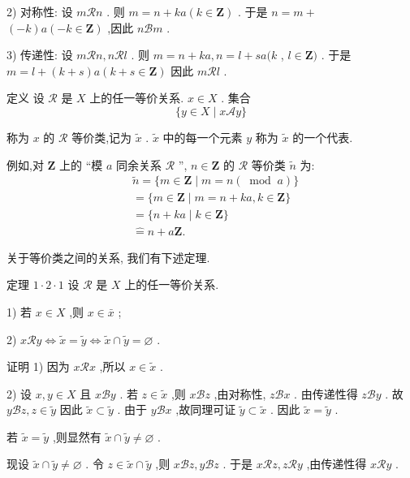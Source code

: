 2) 对称性: 设 $m\mathcal{R}n$ . 则 $m = n + {ka}\left( {k \in  \mathbf{Z}}\right)$ . 于是 $n = m +$  $\left( {-k}\right) a\left( {-k \in  \mathbf{Z}}\right)$ ,因此 $n\mathcal{B}m$ .

3) 传递性: 设 $m\mathcal{R}n,n\mathcal{R}l$ . 则 $m = n + {ka},n = l + {sa}(k$ , $l \in  \mathbf{Z})$ . 于是 $m = l + \left( {k + s}\right) a\left( {k + s \in  \mathbf{Z}}\right)$ 因此 $m\mathcal{R}l$ .

定义 设 $\mathcal{R}$ 是 $X$ 上的任一等价关系. $x \in  X$ . 集合
$$\{ y \in  X \mid  x\mathcal{A}y\}$$

称为 $x$ 的 $\mathcal{R}$ 等价类,记为 $\widetilde{x}$ . $\widetilde{x}$ 中的每一个元素 $y$ 称为 $\widetilde{x}$ 的一个代表.

例如,对 $\mathbf{Z}$ 上的 “模 $a$ 同余关系 $\mathcal{R}$ ”, $n \in  \mathbf{Z}$ 的 $\mathcal{R}$ 等价类 $\widetilde{n}$ 为:
\begin{align*}
	&\widetilde{n} = \{ m \in  \mathbf{Z} \mid  m = n\left( {\;\operatorname{mod}\;a}\right) \}\\
	&= \{ m \in  \mathbf{Z} \mid  m = n + {ka},k \in  \mathbf{Z}\}\\
	&= \{ n + {ka} \mid  k \in  \mathbf{Z}\}\\
	&\widehat{ = }n + a\mathbf{Z}.
\end{align*}

关于等价类之间的关系, 我们有下述定理.

定理 $1 \cdot  2 \cdot  1$ 设 $\mathcal{R}$ 是 $X$ 上的任一等价关系.

1) 若 $x \in  X$ ,则 $x \in  \bar{x}$ ;

2) $x\mathcal{R}y \Leftrightarrow  \widetilde{x} = \widetilde{y} \Leftrightarrow  \widetilde{x} \cap  \widetilde{y} = \varnothing$ .

证明 1) 因为 $x\mathcal{R}x$ ,所以 $x \in  \widetilde{x}$ .

2) 设 $x,y \in  X$ 且 $x\mathcal{B}y$ . 若 $z \in  \widetilde{x}$ ,则 $x\mathcal{B}z$ ,由对称性, $z\mathcal{B}x$ . 由传递性得 $z\mathcal{B}y$ . 故 $y\mathcal{B}z,z \in  \widetilde{y}$ 因此 $\widetilde{x} \subset  \widetilde{y}$ . 由于 $y\mathcal{B}x$ ,故同理可证 $\widetilde{y} \subset  \widetilde{x}$ . 因此 $\widetilde{x} = \widetilde{y}$ .

若 $\widetilde{x} = \widetilde{y}$ ,则显然有 $\widetilde{x} \cap  \widetilde{y} \neq  \varnothing$ .

现设 $\widetilde{x} \cap  \widetilde{y} \neq  \varnothing$ . 令 $z \in  \widetilde{x} \cap  \widetilde{y}$ ,则 $x\mathcal{B}z,y\mathcal{B}z$ . 于是 $x\mathcal{R}z,z\mathcal{R}y$ ,由传递性得 $x\mathcal{R}y$ .

